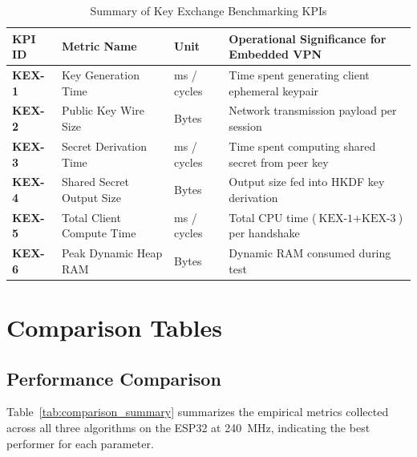 \documentclass[11pt,a4paper]{article}
\begin{document}
\begin{table}[htbp]
\centering
\small
\caption{Summary of Key Exchange Benchmarking KPIs}
\label{tab:kex_kpis}
\begin{tabularx}{\textwidth}{lll X}
\toprule
\textbf{KPI ID} & \textbf{Metric Name} & \textbf{Unit} & \textbf{Operational Significance for Embedded VPN} \\
\midrule
\textbf{KEX-1} & Key Generation Time & ms / cycles & Time spent generating client ephemeral keypair \\
\textbf{KEX-2} & Public Key Wire Size & Bytes & Network transmission payload per session \\
\textbf{KEX-3} & Secret Derivation Time & ms / cycles & Time spent computing shared secret from peer key \\
\textbf{KEX-4} & Shared Secret Output Size & Bytes & Output size fed into HKDF key derivation \\
\textbf{KEX-5} & Total Client Compute Time & ms / cycles & Total CPU time ($\text{KEX-1} + \text{KEX-3}$) per handshake \\
\textbf{KEX-6} & Peak Dynamic Heap RAM & Bytes & Dynamic RAM consumed during test \\
\bottomrule
\end{tabularx}
\end{table}

\section{Comparison Tables}

\subsection{Performance Comparison}

Table~\ref{tab:comparison_summary} summarizes the empirical metrics collected across all three algorithms on the ESP32 at 240~MHz, indicating the best performer for each parameter.
\end{document}
